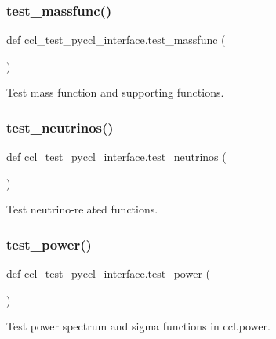 \subsubsection{\texorpdfstring{test\+\_\+massfunc()}{test\_massfunc()}}
{\footnotesize\ttfamily def ccl\+\_\+test\+\_\+pyccl\+\_\+interface.\+test\+\_\+massfunc (\begin{DoxyParamCaption}{ }\end{DoxyParamCaption})}

\begin{DoxyVerb}Test mass function and supporting functions.
\end{DoxyVerb}
 \mbox{\label{namespaceccl__test__pyccl__interface_ae4c580c07c1b1ff62524d160ea8d6756}} 
\subsubsection{\texorpdfstring{test\+\_\+neutrinos()}{test\_neutrinos()}}
{\footnotesize\ttfamily def ccl\+\_\+test\+\_\+pyccl\+\_\+interface.\+test\+\_\+neutrinos (\begin{DoxyParamCaption}{ }\end{DoxyParamCaption})}

\begin{DoxyVerb}Test neutrino-related functions.
\end{DoxyVerb}
 \mbox{\label{namespaceccl__test__pyccl__interface_aa0fa1e5e5f099cfa4e0c55e8cc80f585}} 
\subsubsection{\texorpdfstring{test\+\_\+power()}{test\_power()}}
{\footnotesize\ttfamily def ccl\+\_\+test\+\_\+pyccl\+\_\+interface.\+test\+\_\+power (\begin{DoxyParamCaption}{ }\end{DoxyParamCaption})}

\begin{DoxyVerb}Test power spectrum and sigma functions in ccl.power.
\end{DoxyVerb}
 
